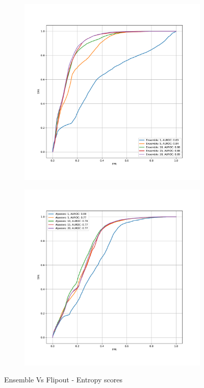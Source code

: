     \begin{figure}[h!]
        \begin{subfigure}{0.495\textwidth}
            \includegraphics[scale=0.35]{images/ensemble_entropy_sem3dvs3dis_AUROC.pdf}
        \end{subfigure}
        \begin{subfigure}{0.495\textwidth}
            \includegraphics[scale=0.35]{images/flipout_entropy_sem3dvs3dis_AUROC.pdf}
        \end{subfigure}
        \caption{Ensemble Vs Flipout - Entropy scores}
    \end{figure}



